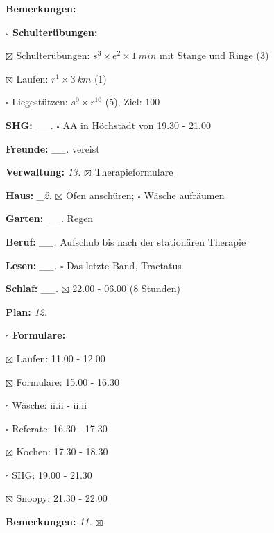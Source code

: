 \documentclass[10pt,a4paper]{article}
\newcommand\prop[1] {{\color {alizarin} {\bf #1}}}        %
\newcommand\mand[1] {{\color {burntorange} {\bf #1}}}     %
\newcommand\topspace{\vskip -15pt \hskip 20pt}
\newcommand\bottomspace{\vskip 4pt}
\newcommand\n[1] { {\sl #1.} \hskip 5pt }
\begin{document}
\begin{mdframed}[style=daystyle]
\begin{labeling}{{\mand {Bemerkungen:}}}
\begin{minipage}{0.75\textwidth}
\begin{labeling}{\prop {$\square$ {Schulterübungen:}}}
      \item[$\boxtimes$ Schulterübungen:] $s^3 \times e^2 \times 1\ min$ mit Stange und Ringe (3)
      \item[$\boxtimes$ Laufen:]          $r^1 \times 3\ km$ (1)
      \item[$\square$ Liegestützen:]    $s^0 \times r^{10}$ (5), Ziel: 100
      \end{labeling}
    \end{minipage}
    \bottomspace        
  \item[{\mand {SHG:}}]          \n{\_\_} $\square$ AA in Höchstadt von 19.30 - 21.00
  \item[{\mand {Freunde:}}]      \n{\_\_} vereist
  \item[{\mand {Verwaltung:}}]     \n{13} $\boxtimes$ Therapieformulare
  \item[{\mand {Haus:}}]          \n{\_2} $\boxtimes$ Ofen anschüren; $\square$ Wäsche aufräumen
  \item[{\mand {Garten:}}]       \n{\_\_} Regen
  \item[{\mand {Beruf:}}]        \n{\_\_} Aufschub bis nach der stationären Therapie
  \item[{\mand {Lesen:}}]        \n{\_\_} $\square$ Das letzte Band, Tractatus
  \item[{\mand {Schlaf:}}]       \n{\_\_} $\boxtimes$ 22.00 - 06.00 (8 Stunden)
  \item[{\mand {Plan:}}]           \n{12}
    \topspace
    \begin{minipage}{0.75\textwidth}  
      \begin{labeling}{\prop {$\square$ {Formulare:}}} 
        \setlength\itemsep{-3pt}
      \item[$\boxtimes$ Laufen:]     11.00 - 12.00
      \item[$\boxtimes$ Formulare:]  15.00 - 16.30
      \item[$\square$ Wäsche:]       ii.ii - ii.ii
      \item[$\square$ Referate:]     16.30 - 17.30
      \item[$\boxtimes$ Kochen:]     17.30 - 18.30
      \item[$\square$ SHG:]          19.00 - 21.30
      \item[$\boxtimes$ Snoopy:]     21.30 - 22.00
      \end{labeling}
    \end{minipage}
    \bottomspace
  \item[{\mand {Bemerkungen:}}]    \n{11} $\boxtimes$
  \end{labeling}
  

\end{mdframed}
\end{document}
